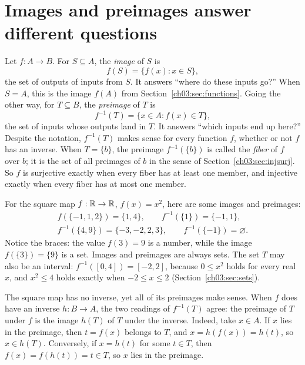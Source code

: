 \section{Images and preimages answer different questions}\label{ch03:sec:images}
Let $f:A\to B$. For $S\subseteq A$, the \emph{image} of $S$ is
\[
f(S)=\{f(x):x\in S\},
\]
the set of outputs of inputs from $S$. It answers ``where do these inputs go?'' When $S=A$, this is the image $f(A)$ from Section~\ref{ch03:sec:functions}. Going the other way, for $T\subseteq B$, the \emph{preimage} of $T$ is
\[
f^{-1}(T)=\{x\in A:f(x)\in T\},
\]
the set of inputs whose outputs land in $T$. It answers ``which inputs end up here?'' Despite the notation, $f^{-1}(T)$ makes sense for every function $f$, whether or not $f$ has an inverse. When $T=\{b\}$, the preimage $f^{-1}(\{b\})$ is called the \emph{fiber} of $f$ over $b$; it is the set of all preimages of $b$ in the sense of Section~\ref{ch03:sec:injsurj}. So $f$ is surjective exactly when every fiber has at least one member, and injective exactly when every fiber has at most one member.

For the square map $f:\mathbb R\to\mathbb R$, $f(x)=x^2$, here are some images and preimages:
\begin{gather*}
f(\{-1,1,2\})=\{1,4\},\qquad f^{-1}(\{1\})=\{-1,1\},\\
f^{-1}(\{4,9\})=\{-3,-2,2,3\},\qquad f^{-1}(\{-1\})=\varnothing.
\end{gather*}
Notice the braces: the value $f(3)=9$ is a number, while the image $f(\{3\})=\{9\}$ is a set. Images and preimages are always sets. The set $T$ may also be an interval: $f^{-1}([0,4])=[-2,2]$, because $0\le x^2$ holds for every real $x$, and $x^2\le4$ holds exactly when $-2\le x\le2$ (Section~\ref{ch03:sec:sets}).

The square map has no inverse, yet all of its preimages make sense. When $f$ does have an inverse $h:B\to A$, the two readings of $f^{-1}(T)$ agree: the preimage of $T$ under $f$ is the image $h(T)$ of $T$ under the inverse. Indeed, take $x\in A$. If $x$ lies in the preimage, then $t=f(x)$ belongs to $T$, and $x=h(f(x))=h(t)$, so $x\in h(T)$. Conversely, if $x=h(t)$ for some $t\in T$, then $f(x)=f(h(t))=t\in T$, so $x$ lies in the preimage.


